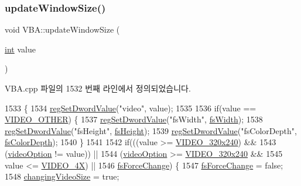 \subsubsection{\texorpdfstring{update\+Window\+Size()}{updateWindowSize()}}
{\footnotesize\ttfamily void V\+B\+A\+::update\+Window\+Size (\begin{DoxyParamCaption}\item[{\mbox{\hyperlink{_util_8cpp_a0ef32aa8672df19503a49fab2d0c8071}{int}}}]{value }\end{DoxyParamCaption})}



V\+B\+A.\+cpp 파일의 1532 번째 라인에서 정의되었습니다.


\begin{DoxyCode}
1533 \{
1534   \mbox{\hyperlink{_reg_8cpp_a758e775489a3fb5c3cc7071fdd5af87e}{regSetDwordValue}}(\textcolor{stringliteral}{"video"}, value);
1535 
1536   \textcolor{keywordflow}{if}(value == \mbox{\hyperlink{_v_b_a_8h_a531c35e38ede3ea4e5ba5afb24b29493acab4f90135b50a88563541e679dd6cee}{VIDEO\_OTHER}}) \{
1537     \mbox{\hyperlink{_reg_8cpp_a758e775489a3fb5c3cc7071fdd5af87e}{regSetDwordValue}}(\textcolor{stringliteral}{"fsWidth"}, \mbox{\hyperlink{class_v_b_a_a92ef1c149914189da4d110d6dada54bb}{fsWidth}});
1538     \mbox{\hyperlink{_reg_8cpp_a758e775489a3fb5c3cc7071fdd5af87e}{regSetDwordValue}}(\textcolor{stringliteral}{"fsHeight"}, \mbox{\hyperlink{class_v_b_a_a1e59d9254f1cb6420502c537c35dd5ec}{fsHeight}});
1539     \mbox{\hyperlink{_reg_8cpp_a758e775489a3fb5c3cc7071fdd5af87e}{regSetDwordValue}}(\textcolor{stringliteral}{"fsColorDepth"}, \mbox{\hyperlink{class_v_b_a_a1baf02b3f4ad129bfd713f1a132e96b9}{fsColorDepth}});
1540   \}
1541   
1542   \textcolor{keywordflow}{if}(((value >= \mbox{\hyperlink{_v_b_a_8h_a531c35e38ede3ea4e5ba5afb24b29493a658665cfbdbd908bdb77babe125d0341}{VIDEO\_320x240}}) &&
1543       (\mbox{\hyperlink{class_v_b_a_a17dac073149c897f770c00ed7098ad32}{videoOption}} != value)) ||
1544      (\mbox{\hyperlink{class_v_b_a_a17dac073149c897f770c00ed7098ad32}{videoOption}} >= \mbox{\hyperlink{_v_b_a_8h_a531c35e38ede3ea4e5ba5afb24b29493a658665cfbdbd908bdb77babe125d0341}{VIDEO\_320x240}} &&
1545       value <= \mbox{\hyperlink{_v_b_a_8h_a531c35e38ede3ea4e5ba5afb24b29493a6468bce6b84e6350d3de126f257eb38d}{VIDEO\_4X}}) ||
1546      \mbox{\hyperlink{class_v_b_a_a9374990edcde0964629b3c1c2e868878}{fsForceChange}}) \{
1547     \mbox{\hyperlink{class_v_b_a_a9374990edcde0964629b3c1c2e868878}{fsForceChange}} = \textcolor{keyword}{false};
1548     \mbox{\hyperlink{class_v_b_a_ace8fe4b9a73291e292f0d4879cf2c852}{changingVideoSize}} = \textcolor{keyword}{true};

\end{DoxyCode}
